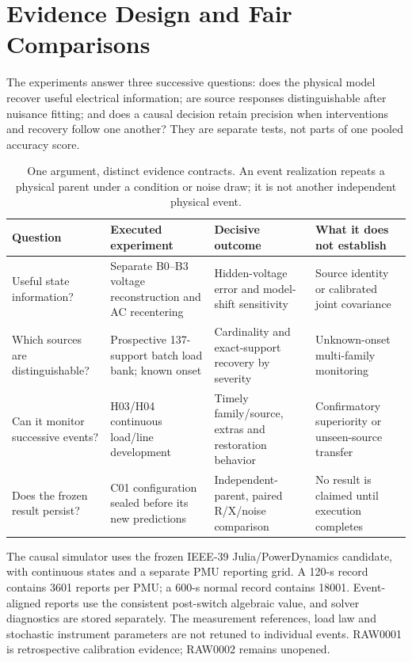 \section{Evidence Design and Fair Comparisons}
\label{sec:narrative-protocol}

The experiments answer three successive questions: does the physical model recover useful electrical information; are source responses distinguishable after nuisance fitting; and does a causal decision retain precision when interventions and recovery follow one another? They are separate tests, not parts of one pooled accuracy score.

\begin{table}[t]\centering\small
\caption{One argument, distinct evidence contracts. An event realization repeats a physical parent under a condition or noise draw; it is not another independent physical event.}\label{tab:narrative-evidence}
\begin{tabularx}{\textwidth}{@{}lXXX@{}}\toprule
Question & Executed experiment & Decisive outcome & What it does not establish\\\midrule
Useful state information? & Separate B0--B3 voltage reconstruction and AC recentering & Hidden-voltage error and model-shift sensitivity & Source identity or calibrated joint covariance\\
Which sources are distinguishable? & Prospective 137-support batch load bank; known onset & Cardinality and exact-support recovery by severity & Unknown-onset multi-family monitoring\\
Can it monitor successive events? & H03/H04 continuous load/line development & Timely family/source, extras and restoration behavior & Confirmatory superiority or unseen-source transfer\\
Does the frozen result persist? & C01 configuration sealed before its new predictions & Independent-parent, paired R/X/noise comparison & No result is claimed until execution completes\\\bottomrule
\end{tabularx}\end{table}

The causal simulator uses the frozen IEEE-39 Julia/PowerDynamics candidate, with continuous states and a separate PMU reporting grid. A 120-s record contains 3601 reports per PMU; a 600-s normal record contains 18001. Event-aligned reports use the consistent post-switch algebraic value, and solver diagnostics are stored separately. The measurement references, load law and stochastic instrument parameters are not retuned to individual events. RAW0001 is retrospective calibration evidence; RAW0002 remains unopened.

